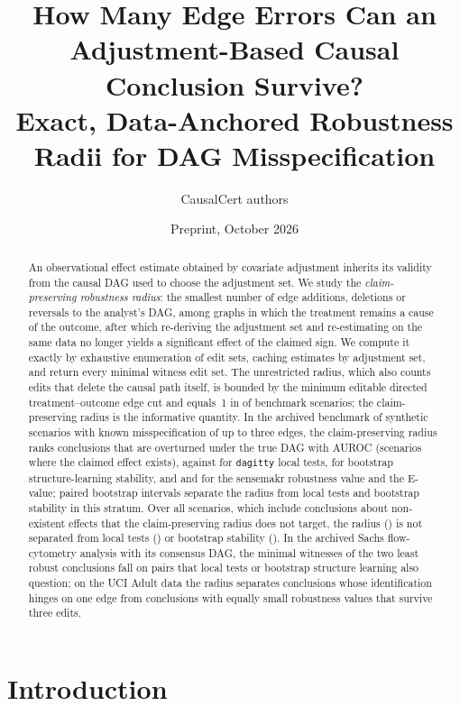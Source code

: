 \documentclass[11pt]{article}
\title{How Many Edge Errors Can an Adjustment-Based Causal Conclusion Survive?\\Exact, Data-Anchored Robustness Radii for DAG Misspecification}
\author{CausalCert authors}
\date{Preprint, October 2026}
\begin{document}
\maketitle

\begin{abstract}
An observational effect estimate obtained by covariate adjustment inherits its validity from the causal DAG used to choose the adjustment set. We study the \emph{claim-preserving robustness radius}: the smallest number of edge additions, deletions or reversals to the analyst's DAG, among graphs in which the treatment remains a cause of the outcome, after which re-deriving the adjustment set and re-estimating on the same data no longer yields a significant effect of the claimed sign. We compute it exactly by exhaustive enumeration of edit sets, caching estimates by adjustment set, and return every minimal witness edit set. The unrestricted radius, which also counts edits that delete the causal path itself, is bounded by the minimum editable directed treatment--outcome edge cut and equals~1 in \BRaOne{} of \BN{} benchmark scenarios; the claim-preserving radius is the informative quantity. In the archived benchmark of \BN{} synthetic scenarios with known misspecification of up to three edges, the claim-preserving radius ranks conclusions that are overturned under the true DAG with AUROC \BRcAUC{} (scenarios where the claimed effect exists), against \BLtAUC{} for \texttt{dagitty} local tests, \BBootAUC{} for bootstrap structure-learning stability, and \BRVAUC{} and \BEvAUC{} for the sensemakr robustness value and the E-value; paired bootstrap intervals separate the radius from local tests and bootstrap stability in this stratum. Over all scenarios, which include conclusions about non-existent effects that the claim-preserving radius does not target, the radius (\BRcAUCall{}) is not separated from local tests (\BLtAUCall{}) or bootstrap stability (\BBootAUCall{}). In the archived Sachs flow-cytometry analysis with its consensus DAG, the minimal witnesses of the two least robust conclusions fall on pairs that local tests or bootstrap structure learning also question; on the UCI Adult data the radius separates conclusions whose identification hinges on one edge from conclusions with equally small robustness values that survive three edits.
\end{abstract}

\section{Introduction}
\end{document}
